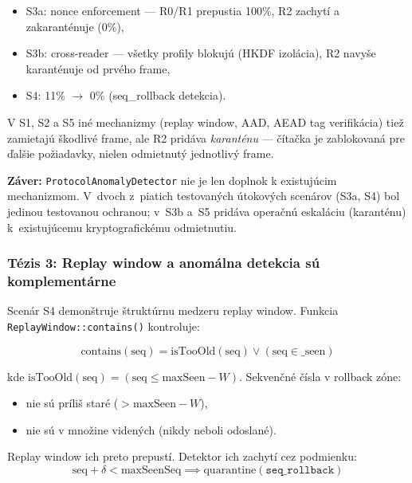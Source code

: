 \begin{itemize}[leftmargin=*,itemsep=2pt]
  \item S3a: nonce enforcement --- R0/R1 prepustia 100\%, R2 zachytí a zakaranténuje (0\%),
  \item S3b: cross-reader --- všetky profily blokujú (HKDF izolácia), R2 navyše karanténuje od prvého frame,
  \item S4: 11\% $\rightarrow$ 0\% (seq\_rollback detekcia).
\end{itemize}

\noindent V S1, S2 a S5 iné mechanizmy (replay window, AAD, AEAD tag verifikácia) tiež zamietajú škodlivé frame, ale R2 pridáva \emph{karanténu} --- čítačka je zablokovaná pre ďalšie požiadavky, nielen odmietnutý jednotlivý frame.

\textbf{Záver:} \texttt{ProtocolAnomalyDetector} nie je len doplnok k existujúcim mechanizmom. V~dvoch z~piatich testovaných útokových scenárov (S3a, S4) bol jedinou testovanou ochranou; v~S3b a~S5 pridáva operačnú eskaláciu (karanténu) k~existujúcemu kryptografickému odmietnutiu.

\subsubsection{Tézis 3: Replay window a anomálna detekcia sú komplementárne}

Scenár S4 demonštruje štruktúrnu medzeru replay window. Funkcia \texttt{ReplayWindow::contains()} kontroluje:

\begin{equation}
\text{contains}(\text{seq}) = \text{isTooOld}(\text{seq}) \lor (\text{seq} \in \text{\_seen})
\end{equation}

\noindent kde $\text{isTooOld}(\text{seq}) = (\text{seq} \leq \text{maxSeen} - W)$. Sekvenčné čísla v rollback zóne:

\begin{itemize}[leftmargin=*,itemsep=1pt]
  \item nie sú príliš staré ($> \text{maxSeen} - W$),
  \item nie sú v množine videných (nikdy neboli odoslané).
\end{itemize}

\noindent Replay window ich preto prepustí. Detektor ich zachytí cez podmienku:
\begin{equation}
\text{seq} + \delta < \text{maxSeenSeq} \implies \text{quarantine}(\texttt{seq\_rollback})
\end{equation}

